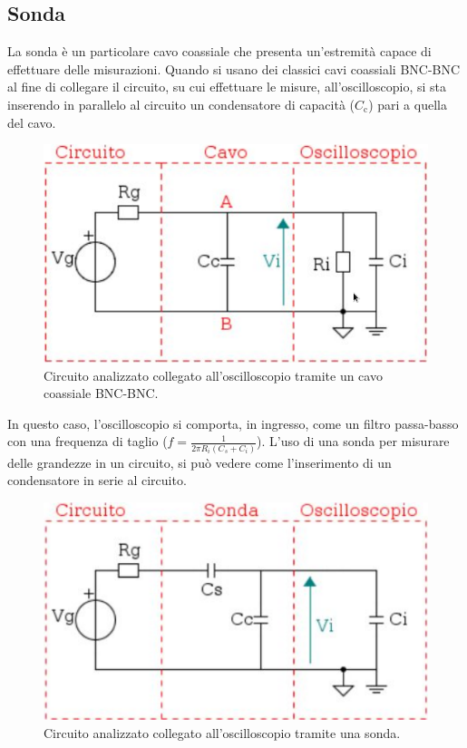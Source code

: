 \documentclass[a4paper]{article}
\begin{document}
		\subsection{Sonda}
			La sonda è un particolare cavo coassiale che presenta un'estremità capace di effettuare delle misurazioni.
			\newline
			Quando si usano dei classici cavi coassiali BNC-BNC al fine di collegare il circuito, su cui effettuare le misure, all'oscilloscopio, si sta inserendo in parallelo al circuito un condensatore di capacità ($ C_{\mathrm{c}} $) pari a quella del cavo.
			\begin{figure}[h!]
				\centering
				\includegraphics[scale=0.4]{theveninCavoDSO}
				\caption{Circuito analizzato collegato all'oscilloscopio tramite un cavo coassiale BNC-BNC.}
				\label{fig:theveninCavoDSO}
			\end{figure}
			\newline
			In questo caso, l’oscilloscopio si comporta, in ingresso, come un filtro passa-basso con una frequenza di taglio ($ f = \frac{1}{2\pi R_{i} (C_{s} + C_{i})} $). L'uso di una sonda per misurare delle grandezze in un circuito, si può vedere come l'inserimento di un condensatore in serie al circuito.
			\begin{figure}[h!]
				\centering
				\includegraphics[scale=0.4]{theveninSondaDSOCircuito}
				\caption{Circuito analizzato collegato all'oscilloscopio tramite una sonda.}
				\label{fig:theveninSondaDSOCircuito}
			\end{figure}
\end{document}
